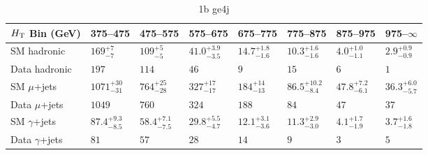\documentclass[8pt]{article}
\def\scalht{\mbox{$H_{\rm{T}}$}\xspace}
\newcommand\T{\rule{0pt}{2.6ex}}
\newcommand\B{\rule[-1.2ex]{0pt}{0pt}}
\begin{document}
\begin{table}[ht!]
\caption{1b ge4j}
\label{tab:ensemble-1b ge4j}
\centering
\begin{tabular}{ llllllll }

\hline
\scalht Bin (GeV)       & 375--475                       & 475--575                       & 575--675                       & 675--775                       & 775--875                       & 875--975                       & 975--$\infty$                  \\ [1.000000ex]
\hline
SM hadronic\T           & $169^{+7}_{-7}$                & $109^{+5}_{-5}$                & $41.0^{+3.9}_{-3.5}$           & $14.7^{+1.8}_{-1.6}$           & $10.3^{+1.6}_{-1.6}$           & $4.0^{+1.0}_{-1.1}$            & $2.9^{+0.9}_{-0.9}$            \\ 
Data hadronic\B         & $197$                          & $114$                          & $46$                           & $9$                            & $15$                           & $6$                            & $1$                            \\ 
\hline
SM $\mu$+jets\T         & $1071^{+30}_{-31}$             & $764^{+25}_{-28}$              & $327^{+17}_{-17}$              & $184^{+14}_{-13}$              & $86.5^{+10.2}_{-8.4}$          & $47.8^{+7.2}_{-6.1}$           & $36.3^{+6.0}_{-5.7}$           \\ 
Data $\mu$+jets\B       & $1049$                         & $760$                          & $324$                          & $188$                          & $84$                           & $47$                           & $37$                           \\ 
\hline
SM $\gamma$+jets\T      & $87.4^{+9.3}_{-8.5}$           & $58.4^{+7.1}_{-7.5}$           & $29.8^{+5.5}_{-4.7}$           & $12.1^{+3.1}_{-3.6}$           & $11.3^{+2.9}_{-3.0}$           & $4.1^{+1.7}_{-1.9}$            & $3.7^{+1.6}_{-1.8}$            \\ 
Data $\gamma$+jets\B    & $81$                           & $57$                           & $28$                           & $14$                           & $9$                            & $3$                            & $5$                            \\ 
\hline

\end{tabular}
\end{table}
\end{document}
